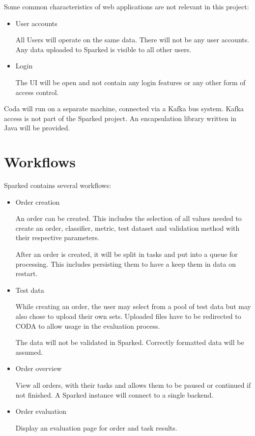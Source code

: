\documentclass[12pt,a4paper,titlepage,oneside,BCOR1cm]{scrreprt}
\begin{document}
Some common characteristics of web applications are not relevant in this project:
\begin{itemize}
  \item User accounts

  All Users will operate on the same data. There will not be any user accounts. Any data uploaded to Sparked is visible to all other users.
  \item Login

  The UI will be open and not contain any login features or any other form of access control.
\end{itemize}

Coda will run on a separate machine, connected via a Kafka bus system. Kafka access is not part of the Sparked project. An encapsulation library written in Java will be provided.

\section{Workflows}

Sparked contains several workflows:
\begin{itemize}
  \item Order creation

  An order can be created. This includes the selection of all values needed to create an order, classifier, metric, test dataset and validation method with their respective parameters.

  After an order is created, it will be split in tasks and put into a queue for processing. This includes persisting them to have a keep them in data on restart.

  \item Test data

  While creating an order, the user may select from a pool of test data but may also chose to upload their own sets. Uploaded files have to be redirected to CODA to allow usage in the evaluation process.

  The data will not be validated in Sparked. Correctly formatted data will be assumed.

  \item Order overview

  View all orders, with their tasks and allows them to be paused or continued if not finished. A Sparked instance will connect to a single backend. 

  \item Order evaluation
  
  Display an evaluation page for order and task results.
\end{itemize}
\end{document}
